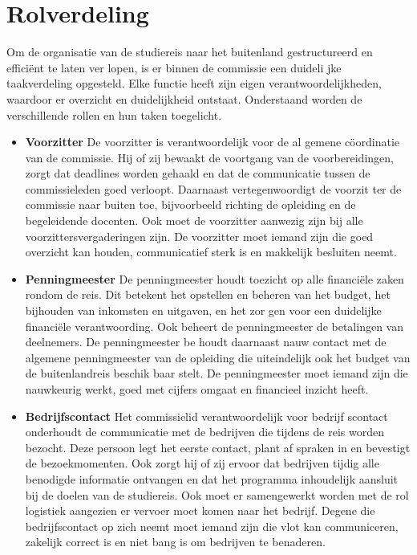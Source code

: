 \section{Rolverdeling}
Om de organisatie van de studiereis naar het
buitenland gestructureerd en efficiënt te laten ver
lopen, is er binnen de commissie een duideli
jke taakverdeling opgesteld. Elke functie heeft zijn
eigen verantwoordelijkheden, waardoor er overzicht
en duidelijkheid ontstaat. Onderstaand worden de
verschillende rollen en hun taken toegelicht.

\begin{itemize}
	\item \textbf{Voorzitter} De voorzitter is verantwoordelijk voor de al
	gemene cöordinatie van de commissie. Hij of zij
	bewaakt de voortgang van de voorbereidingen,
	zorgt dat deadlines worden gehaald en dat de
	communicatie tussen de commissieleden goed
	verloopt. Daarnaast vertegenwoordigt de voorzit
	ter de commissie naar buiten toe, bijvoorbeeld
	richting de opleiding en de begeleidende docenten.
	Ook moet de voorzitter aanwezig zijn bij
	alle voorzittersvergaderingen zijn. De voorzitter
	moet iemand zijn die goed overzicht kan houden,
	communicatief sterk is en makkelijk besluiten
	neemt.
	
	\vspace{0.5cm}
	
	\item \textbf{Penningmeester} De penningmeester houdt toezicht op alle financiële zaken rondom de reis. Dit betekent
	het opstellen en beheren van het budget, het
	bijhouden van inkomsten en uitgaven, en het zor
	gen voor een duidelijke financiële verantwoording.
	Ook beheert de penningmeester de betalingen van deelnemers.
	De penningmeester be
	houdt daarnaast nauw contact met de algemene penningmeester van de opleiding die uiteindelijk
	ook het budget van de buitenlandreis beschik
	baar stelt. De penningmeester moet iemand zijn
	die nauwkeurig werkt, goed met cijfers omgaat
	en financieel inzicht heeft.
	
	\newpage
	
	\item \textbf{Bedrijfscontact} Het commissielid verantwoordelijk voor bedrijf
	scontact onderhoudt de communicatie met de
	bedrijven die tijdens de reis worden bezocht.
	Deze persoon legt het eerste contact, plant af
	spraken in en bevestigt de bezoekmomenten.
	Ook zorgt hij of zij ervoor dat bedrijven tijdig alle
	benodigde informatie ontvangen en dat het programma inhoudelijk aansluit bij de doelen van de
	studiereis. Ook moet er samengewerkt worden
	met de rol logistiek aangezien er vervoer moet
	komen naar het bedrijf. Degene die bedrijfscontact op zich neemt moet iemand zijn die vlot kan
	communiceren, zakelijk correct is en niet bang is
	om bedrijven te benaderen.
	

\end{itemize}
